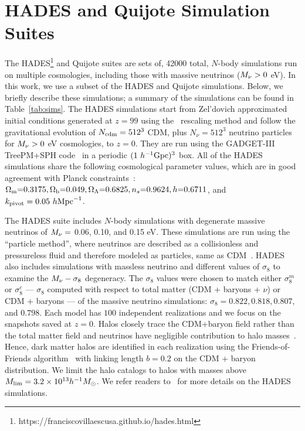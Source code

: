 \section{HADES and Quijote Simulation Suites} \label{sec:hades} 
The HADES\footnote{https://franciscovillaescusa.github.io/hades.html} and Quijote 
suites are sets of, 42000 total, $N$-body simulations run on multiple cosmologies,
including those with massive neutrinos ($M_\nu > 0$ eV). In this work, 
we use a subset of the HADES and Quijote simulations. Below, we briefly describe these simulations; 
a summary of the simulations can be found in Table~\ref{tab:sims}. 
The HADES simulations start from Zel'dovich approximated initial conditions 
generated at $z=99$ using the~\cite{zennaro2017a} rescaling method and follow 
the gravitational evolution of $N_{\rm cdm}=512^3$ CDM, plus $N_{\nu}=512^3$ 
neutrino particles for $M_\nu > 0$ eV cosmologies, to $z=0$. They are run using 
the {\sc GADGET-III} TreePM+SPH code~\citep{springel2005} in a periodic 
$(1~h^{-1}{\rm Gpc})^3$ box. All of the HADES simulations share the following 
cosmological parameter values, which are in good agreement with Planck 
constraints~\cite{ade2016a}: $\Omega_{\rm m}{=}0.3175, \Omega_{\rm b}{=}0.049, \Omega_\Lambda{=}0.6825, n_s{=}0.9624, h{=}0.6711$, 
and $k_{\rm pivot} = 0.05~h{\rm Mpc}^{-1}$. 

The HADES suite includes $N$-body simulations with degenerate massive neutrinos 
of $M_\nu = $ 0.06, 0.10, and 0.15 eV. These simulations are run using the 
``particle method'', where neutrinos are described as a collisionless 
and pressureless fluid and therefore modeled as particles, same as 
CDM~\citep{brandbyge2008,viel2010}. HADES also includes simulations with massless 
neutrino and different values of $\sigma_8$ to examine the $M_\nu-\sigma_8$ 
degeneracy. The $\sigma_8$ values were chosen to match either $\sigma_8^m$ or 
$\sigma_8^{c}$ --- $\sigma_8$ computed with respect to total matter 
(CDM + baryons + $\nu$) or CDM + baryons --- of the massive neutrino simulations: 
$\sigma_8 = 0.822, 0.818, 0.807$, and $0.798$. Each model has $100$ independent 
realizations and we focus on the snapshots saved at $z = 0$. Halos closely 
trace the CDM+baryon field rather than the total matter field and neutrinos 
have negligible contribution to halo masses~\citep[\emph{e.g.}][]{ichiki2012, castorina2014, loverde2014, villaescusa-navarro2014}.
Hence, dark matter halos are identified in each realization using the Friends-of-Friends 
algorithm~\cite[FoF;][]{davis1985} with linking length $b=0.2$ on the CDM + baryon
distribution. We limit the halo catalogs to halos with masses above 
$M_{\rm lim} = 3.2\times 10^{13} h^{-1}M_\odot$. We refer readers
to~\cite{villaescusa-navarro2018} for more details on the HADES simulations. 

